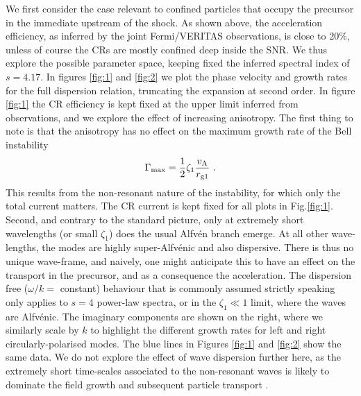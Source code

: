 \documentclass[a4paper,fleqn,usenatbib]{mnras}
\newcommand{\eqb}{\begin{eqnarray}}
\newcommand{\eqe}{\end{eqnarray}}
\begin{document}
We first consider the case relevant to confined particles that occupy the precursor in the immediate upstream of the shock. {As shown above, the acceleration efficiency, as inferred by the joint Fermi/VERITAS observations, is close to 20\%, unless of course the CRs are mostly confined deep inside the SNR. We thus explore the possible parameter space, keeping fixed the inferred spectral index of $s=4.17$.}
In figures \ref{fig:1} and \ref{fig:2} we plot the phase velocity and growth rates for the full dispersion relation, truncating the expansion at second order. In figure \ref{fig:1} the CR efficiency is kept fixed at the upper limit inferred from observations, and we explore the effect of increasing anisotropy. The first thing to note is that the anisotropy has no effect on the maximum growth rate of the Bell instability
\eqb
\label{maxrate}
\Gamma_{\rm max} = \frac{1}{2}\zeta_1 \frac{v_{\rm A}}{r_{\rm g1}}~.
\eqe
This results from the non-resonant nature of the instability, for which only the total current matters. The CR current is kept fixed for all plots in Fig.\ref{fig:1}. Second, and contrary to the standard picture, only at extremely short wavelengths (or small $\zeta_1$) does the usual Alfv\'en branch emerge. At all other wave-lengths, the modes are highly super-Alfv\'enic and also dispersive. There is thus no unique wave-frame, and naively, one might anticipate this to have an effect on the transport in the precursor, and as a consequence the acceleration. The dispersion free ($\omega/k =$ constant) behaviour that is commonly assumed strictly speaking only applies to $s=4$ power-law spectra, or in the $\zeta_1\ll 1$ limit, where the waves are Alfv\'enic. 
The imaginary components are shown on the right, where we similarly scale by $k$ to highlight the different growth rates for left and right circularly-polarised modes. The blue lines in Figures \ref{fig:1} and \ref{fig:2} show the same data. We do not explore the effect of wave dispersion further here, as the extremely short time-scales associated to the non-resonant waves is likely to dominate the field growth and subsequent particle transport \cite[e.g.][]{Reville13,Bell13}. 
\end{document}
